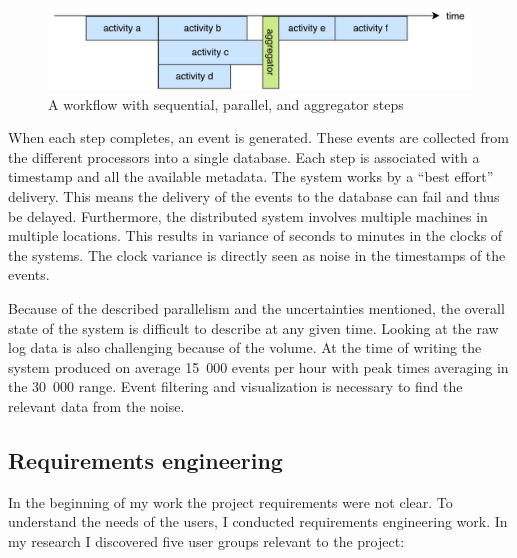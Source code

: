 \begin{figure}[htb]
\centering \includegraphics[width=0.9\linewidth]{gfx/figures/workflow.pdf}
\caption{A workflow with sequential, parallel, and aggregator steps}
\label{fig:workflowexample}
\end{figure}

When each step completes, an event is generated.
These events are collected from the different processors into a single database.
Each step is associated with a timestamp and all the available metadata.
The system works by a ``best effort'' delivery. 
This means the delivery of the events to the database can fail and thus be delayed.
Furthermore, the distributed system involves multiple machines in multiple locations. 
This results in variance of seconds to minutes in the clocks of the systems.
The clock variance is directly seen as noise in the timestamps of the events.

Because of the described parallelism and the uncertainties mentioned, the overall state of the system is difficult to describe at any given time.
Looking at the raw log data is also challenging because of the volume.
At the time of writing the system produced on average 15~000 events per hour with peak times averaging in the 30~000 range.
Event filtering and visualization is necessary to find the relevant data from the noise.

\subsection{Requirements engineering}

In the beginning of my work the project requirements were not clear.
To understand the needs of the users, I conducted requirements engineering work.
In my research I discovered five user groups relevant to the project:

